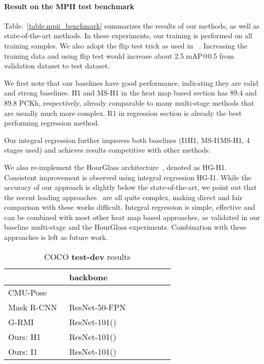 \documentclass[runningheads]{llncs}
\begin{document}
\paragraph{\textbf{Result on the MPII test benchmark}} Table.~\ref{table.mpii_benchmark} summarizes the results of our methods, as well as state-of-the-art methods. In these experiments, our training is performed on all  training samples. We also adopt the flip test trick as used in ~\cite{newell2016stacked}. Increasing the training data and using flip test would increase about 2.5 mAP@0.5 from validation dataset to test dataset.

We first note that our baselines have good performance, indicating they are valid and strong baselines. H1 and MS-H1 in the heat map based section has 89.4 and 89.8 PCKh, respectively, already comparable to many multi-stage methods that are usually much more complex. R1 in regression section is already the best performing regression method.

Our integral regression further improves both baselines (I1H1, MS-I1MS-H1, 4 stages used) and achieves results competitive with other methods.

We also re-implement the HourGlass architecture~\cite{newell2016stacked}, denoted as HG-H1. Consistent improvement is observed using integral regression HG-I1. While the accuracy of our approach is slightly below the state-of-the-art, we point out that the recent leading approaches~\cite{chu2017multi,chou2017self,chen2017adversarial,yang2017learning} are all quite complex, making direct and fair comparison with these works difficult. Integral regression is simple, effective and can be combined with most other heat map based approaches, as validated in our baseline multi-stage and the HourGlass experiments. Combination with these approaches is left as future work.

\begin{table}[t]
\caption{COCO \textbf{test-dev} results}
\begin{center}
\begin{tabular}{l | l| l  l  l | l  l}
\hline
 &backbone&&&&& \\
\hline
CMU-Pose~\cite{cao2016realtime}&&&&&&\\
Mask R-CNN~\cite{he2017mask}&ResNet-50-FPN&&&&&\\
G-RMI~\cite{papandreou2017towards}&ResNet-101()&&&&&\\
\hline
Ours: H1& ResNet-101()& && & &\\
Ours: I1& ResNet-101()& & & && \\
\hline
\end{tabular}
\end{center}
\label{table.exp_coco}
\end{table}
\end{document}
